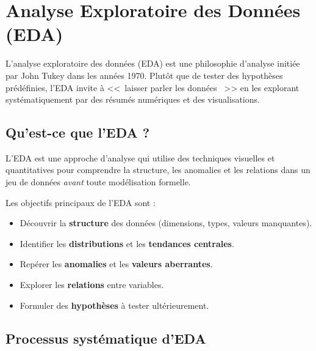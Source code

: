 \chapter{Analyse Exploratoire des Donn\'ees (EDA)}
\label{ch:eda}

\begin{intuition}
L'analyse exploratoire des donn\'ees (EDA) est une philosophie d'analyse initi\'ee par John Tukey dans les ann\'ees 1970. Plut\^ot que de tester des hypoth\`eses pr\'ed\'efinies, l'EDA invite \`a <<~laisser parler les donn\'ees ~>> en les explorant syst\'ematiquement par des r\'esum\'es num\'eriques et des visualisations.
\end{intuition}

\section{Qu'est-ce que l'EDA ?}

\begin{definition}
L'EDA est une approche d'analyse qui utilise des techniques visuelles et quantitatives pour comprendre la structure, les anomalies et les relations dans un jeu de donn\'ees \emph{avant} toute mod\'elisation formelle.
\end{definition}

Les objectifs principaux de l'EDA sont :
\begin{itemize}
    \item D\'ecouvrir la \textbf{structure} des donn\'ees (dimensions, types, valeurs manquantes).
    \item Identifier les \textbf{distributions} et les \textbf{tendances centrales}.
    \item Rep\'erer les \textbf{anomalies} et les \textbf{valeurs aberrantes}.
    \item Explorer les \textbf{relations} entre variables.
    \item Formuler des \textbf{hypoth\`eses} \`a tester ult\'erieurement.
\end{itemize}

\section{Processus syst\'ematique d'EDA}

